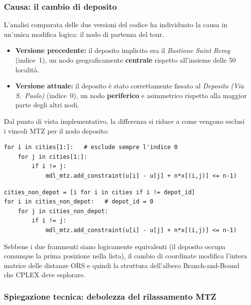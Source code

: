 \documentclass[a4paper,12pt]{article}
\begin{document}
\subsubsection*{Causa: il cambio di deposito}

L'analisi comparata delle due versioni del codice ha individuato la causa in un'unica modifica logica: il nodo di partenza del tour.

\begin{itemize}
  \item \textbf{Versione precedente:} il deposito implicito era il \textit{Bastione Saint Remy} (indice~1), un nodo geograficamente \textbf{centrale} rispetto all'insieme delle 50 località.
  \item \textbf{Versione attuale:} il deposito è stato correttamente fissato al \textit{Deposito (Via S.~Paolo)} (indice~0), un nodo \textbf{periferico} e asimmetrico rispetto alla maggior parte degli altri nodi.
\end{itemize}

Dal punto di vista implementativo, la differenza si riduce a come vengono esclusi i vincoli MTZ per il nodo deposito:

\begin{lstlisting}[caption={Vecchio codice: esclusione implicita del nodo 0},label={lst:mtz_old}]
for i in cities[1:]:   # esclude sempre l'indice 0
    for j in cities[1:]:
        if i != j:
            mdl_mtz.add_constraint(u[i] - u[j] + n*x[(i,j)] <= n-1)
\end{lstlisting}

\begin{lstlisting}[caption={Nuovo codice: esclusione esplicita del deposito reale},label={lst:mtz_new}]
cities_non_depot = [i for i in cities if i != depot_id]
for i in cities_non_depot:   # depot_id = 0
    for j in cities_non_depot:
        if i != j:
            mdl_mtz.add_constraint(u[i] - u[j] + n*x[(i,j)] <= n-1)
\end{lstlisting}

Sebbene i due frammenti siano logicamente equivalenti (il deposito occupa comunque la prima posizione nella lista), il cambio di coordinate modifica l'intera matrice delle distanze ORS e quindi la struttura dell'albero Branch-and-Bound che CPLEX deve esplorare.

\subsubsection*{Spiegazione tecnica: debolezza del rilassamento MTZ}
\end{document}
